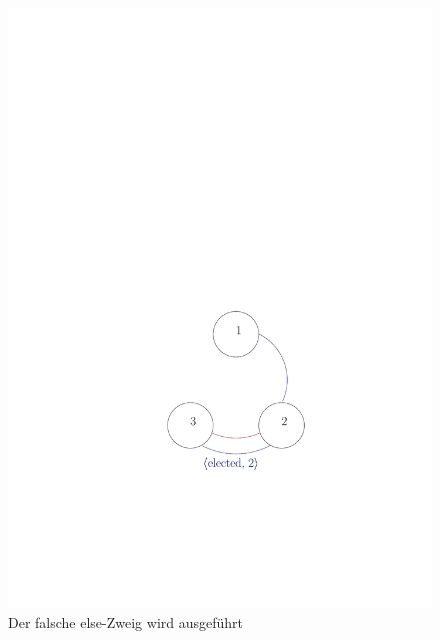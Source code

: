 \begin{figure}
  \begin{center}
    \includegraphics{./pics/9_1_2}
  \end{center}
  \caption{Der falsche else-Zweig wird ausgeführt}
  \label{fig:9_1_2}
\end{figure}

